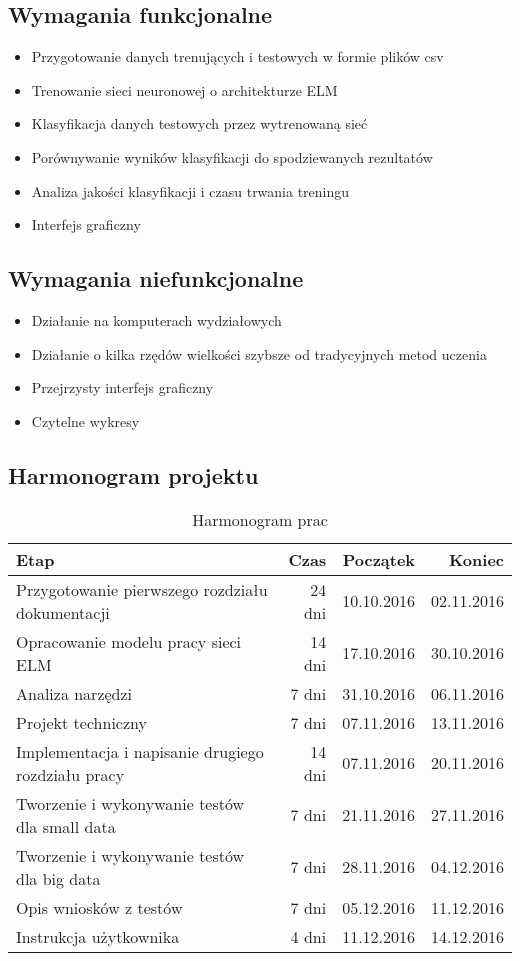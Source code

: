 \documentclass{article}
\begin{document}
\subsection{Wymagania funkcjonalne}
\begin{itemize}
\item Przygotowanie danych trenujących i testowych w formie plików csv
\item Trenowanie sieci neuronowej o architekturze ELM
\item Klasyfikacja danych testowych przez wytrenowaną sieć
\item Porównywanie wyników klasyfikacji do spodziewanych rezultatów
\item Analiza jakości klasyfikacji i  czasu trwania treningu
\item Interfejs graficzny
\end{itemize}
\subsection{Wymagania niefunkcjonalne}
\begin{itemize}
\item Działanie na komputerach wydziałowych
\item Działanie o kilka rzędów wielkości szybsze od tradycyjnych metod uczenia
\item Przejrzysty interfejs graficzny
\item Czytelne wykresy
\end{itemize}
\subsection{Harmonogram projektu}
\begin{table}[H]
\caption{Harmonogram prac}
\begin{tabular}{|l|r|r|r|}
\hline
\textbf{Etap} & \textbf{Czas} & \textbf{Początek} & \textbf{Koniec} \\
\hline
Przygotowanie pierwszego rozdziału dokumentacji & 24 dni & 10.10.2016 & 02.11.2016 \\
Opracowanie modelu pracy sieci ELM & 14 dni & 17.10.2016 & 30.10.2016 \\
Analiza narzędzi & 7 dni & 31.10.2016 & 06.11.2016 \\
Projekt techniczny & 7 dni & 07.11.2016 & 13.11.2016 \\
Implementacja i napisanie drugiego rozdziału pracy & 14 dni & 07.11.2016 & 20.11.2016 \\
Tworzenie i wykonywanie testów dla small data & 7 dni & 21.11.2016 & 27.11.2016 \\
Tworzenie i wykonywanie testów dla big data & 7 dni & 28.11.2016 & 04.12.2016 \\
Opis wniosków z testów & 7 dni & 05.12.2016 & 11.12.2016 \\
Instrukcja użytkownika & 4 dni & 11.12.2016 & 14.12.2016 \\
\hline
\end{tabular}
\end{table}
\end{document}
